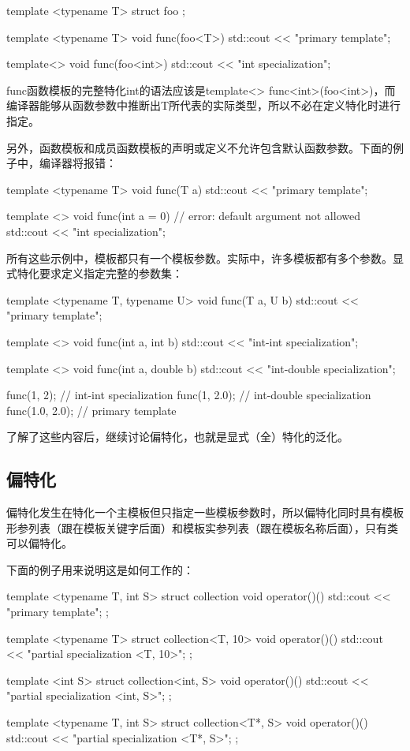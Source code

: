 \begin{cppcode}
template <typename T>
struct foo {};

template <typename T>
void func(foo<T>)
{
	std::cout << "primary template\n";
}

template<>
void func(foo<int>)
{
	std::cout << "int specialization\n";
}
\end{cppcode}

func函数模板的完整特化int的语法应该是template<> func<int>(foo<int>)，而编译器能够从函数参数中推断出T所代表的实际类型，所以不必在定义特化时进行指定。

另外，函数模板和成员函数模板的声明或定义不允许包含默认函数参数。下面的例子中，编译器将报错：

\begin{cppcode}
template <typename T>
void func(T a)
{
	std::cout << "primary template\n";
}

template <>
void func(int a = 0) // error: default argument not allowed
{
	std::cout << "int specialization\n";
}
\end{cppcode}

所有这些示例中，模板都只有一个模板参数。实际中，许多模板都有多个参数。显式特化要求定义指定完整的参数集：

\begin{cppcode}
template <typename T, typename U>
void func(T a, U b)
{
	std::cout << "primary template\n";
}

template <>
void func(int a, int b)
{
std::cout << "int-int specialization\n";
}

template <>
void func(int a, double b)
{
std::cout << "int-double specialization\n";
}

func(1, 2); // int-int specialization
func(1, 2.0); // int-double specialization
func(1.0, 2.0); // primary template
\end{cppcode}

了解了这些内容后，继续讨论偏特化，也就是显式（全）特化的泛化。

\subsection{偏特化}

偏特化发生在特化一个主模板但只指定一些模板参数时，所以偏特化同时具有模板形参列表（跟在模板关键字后面）和模板实参列表（跟在模板名称后面），只有类可以偏特化。

下面的例子用来说明这是如何工作的：

\begin{cppcode}
template <typename T, int S>
struct collection
{
	void operator()()
	{ std::cout << "primary template\n"; }
};

template <typename T>
struct collection<T, 10>
{
	void operator()()
	{ std::cout << "partial specialization <T, 10>\n"; }
};

template <int S>
struct collection<int, S>
{
	void operator()()
	{ std::cout << "partial specialization <int, S>\n"; }
};

template <typename T, int S>
struct collection<T*, S>
{
	void operator()()
	{ std::cout << "partial specialization <T*, S>\n"; }
};
\end{cppcode}

